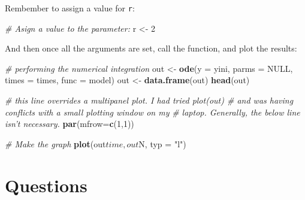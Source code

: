 \documentclass[]{book}
\newenvironment{Shaded}{\begin{snugshade}}{\end{snugshade}}
\newcommand{\KeywordTok}[1]{\textcolor[rgb]{0.13,0.29,0.53}{\textbf{{#1}}}}
\newcommand{\DataTypeTok}[1]{\textcolor[rgb]{0.13,0.29,0.53}{{#1}}}
\newcommand{\DecValTok}[1]{\textcolor[rgb]{0.00,0.00,0.81}{{#1}}}
\newcommand{\StringTok}[1]{\textcolor[rgb]{0.31,0.60,0.02}{{#1}}}
\newcommand{\CommentTok}[1]{\textcolor[rgb]{0.56,0.35,0.01}{\textit{{#1}}}}
\newcommand{\OtherTok}[1]{\textcolor[rgb]{0.56,0.35,0.01}{{#1}}}
\newcommand{\NormalTok}[1]{{#1}}
\begin{document}
Rembember to assign a value for \texttt{r}:

\begin{Shaded}
\begin{Highlighting}[]
\CommentTok{# Asign a value to the parameter:}
\NormalTok{r <-}\StringTok{ }\DecValTok{2}
\end{Highlighting}
\end{Shaded}

And then once all the arguments are set, call the function, and plot the
results:

\begin{Shaded}
\begin{Highlighting}[]
\CommentTok{# performing the numerical integration}
\NormalTok{out <-}\StringTok{ }\KeywordTok{ode}\NormalTok{(}\DataTypeTok{y =} \NormalTok{yini, }\DataTypeTok{parms =} \OtherTok{NULL}\NormalTok{, }\DataTypeTok{times =} \NormalTok{times, }\DataTypeTok{func =} \NormalTok{model)}
\NormalTok{out <-}\StringTok{ }\KeywordTok{data.frame}\NormalTok{(out)}
\KeywordTok{head}\NormalTok{(out)}

\CommentTok{# this line overrides a multipanel plot. I had tried plot(out) # and was having conflicts with a small plotting window on my}
\CommentTok{# laptop. Generally, the below line isn't necessary.}
\KeywordTok{par}\NormalTok{(}\DataTypeTok{mfrow=}\KeywordTok{c}\NormalTok{(}\DecValTok{1}\NormalTok{,}\DecValTok{1}\NormalTok{))}

\CommentTok{# Make the graph}
\KeywordTok{plot}\NormalTok{(out$time, out$N, }\DataTypeTok{typ =} \StringTok{"l"}\NormalTok{)}
\end{Highlighting}
\end{Shaded}

\section{Questions}\label{questions}
\end{document}
